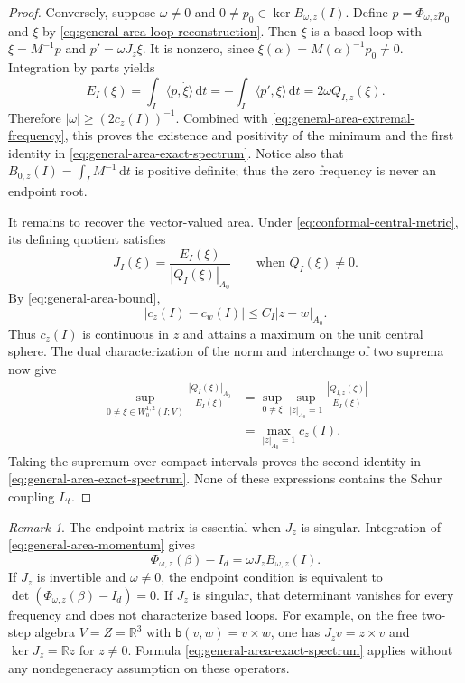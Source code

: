 \documentclass[10pt,a4paper]{article}
\numberwithin{equation}{section}
\theoremstyle{definition}
\theoremstyle{remark}
\newtheorem{remark}[theorem]{Remark}
\newcommand{\R}{\mathbb R}
\newcommand{\dd}{\mathrm d}
\begin{document}
\begin{proof}
Conversely, suppose $\omega\ne0$ and
$0\ne p_0\in\ker B_{\omega,z}(I)$.  Define
$p=\Phi_{\omega,z}p_0$ and $\xi$ by
\eqref{eq:general-area-loop-reconstruction}.  Then $\xi$ is a based
loop with $\dot\xi=M^{-1}p$ and $p'=\omega J_z\dot\xi$.
It is nonzero, since $\dot\xi(\alpha)=M(\alpha)^{-1}p_0\ne0$.
Integration by parts yields
\[
 E_I(\xi)=\int_I\langle p,\dot\xi\rangle\,\dd t
  =-\int_I\langle p',\xi\rangle\,\dd t
  =2\omega Q_{I,z}(\xi).
\]
Therefore $|\omega|\ge(2c_z(I))^{-1}$.  Combined with
\eqref{eq:general-area-extremal-frequency}, this proves the existence
and positivity of the minimum and the first identity in
\eqref{eq:general-area-exact-spectrum}.  Notice also that
$B_{0,z}(I)=\int_I M^{-1}\,\dd t$ is positive definite; thus the zero
frequency is never an endpoint root.

It remains to recover the vector-valued area.  Under
\eqref{eq:conformal-central-metric}, its defining quotient satisfies
\[
 J_I(\xi)=\frac{E_I(\xi)}{|Q_I(\xi)|_{A_0}}
 \qquad\text{when }Q_I(\xi)\ne0.
\]
By \eqref{eq:general-area-bound},
\[
 |c_z(I)-c_w(I)|\le C_I|z-w|_{A_0}.
\]
Thus $c_z(I)$ is continuous in $z$ and attains a maximum on the unit
central sphere.  The dual characterization of the norm and interchange
of two suprema now give
\begin{align*}
 \sup_{0\ne\xi\in W^{1,2}_0(I;V)}
      \frac{|Q_I(\xi)|_{A_0}}{E_I(\xi)}
 &=\sup_{0\ne\xi}\sup_{|z|_{A_0}=1}
      \frac{|Q_{I,z}(\xi)|}{E_I(\xi)}\\
 &=\max_{|z|_{A_0}=1}c_z(I).
\end{align*}
Taking the supremum over compact intervals proves the second identity
in \eqref{eq:general-area-exact-spectrum}.  None of these expressions
contains the Schur coupling $L_t$.
\end{proof}

\begin{remark}
The endpoint matrix is essential when $J_z$ is singular.  Integration
of \eqref{eq:general-area-momentum} gives
\begin{equation}
 \Phi_{\omega,z}(\beta)-I_d
       =\omega J_zB_{\omega,z}(I).
 \label{eq:general-area-return-endpoint}
\end{equation}
If $J_z$ is invertible and $\omega\ne0$, the endpoint condition is
equivalent to $\det(\Phi_{\omega,z}(\beta)-I_d)=0$.  If $J_z$ is
singular, that determinant vanishes for every frequency and does not
characterize based loops.  For example, on the free two-step algebra
$V=Z=\R^3$ with $\mathsf b(v,w)=v\times w$, one has
$J_zv=z\times v$ and $\ker J_z=\R z$ for $z\ne0$.
Formula \eqref{eq:general-area-exact-spectrum} applies without any
nondegeneracy assumption on these operators.
\end{remark}
\end{document}
